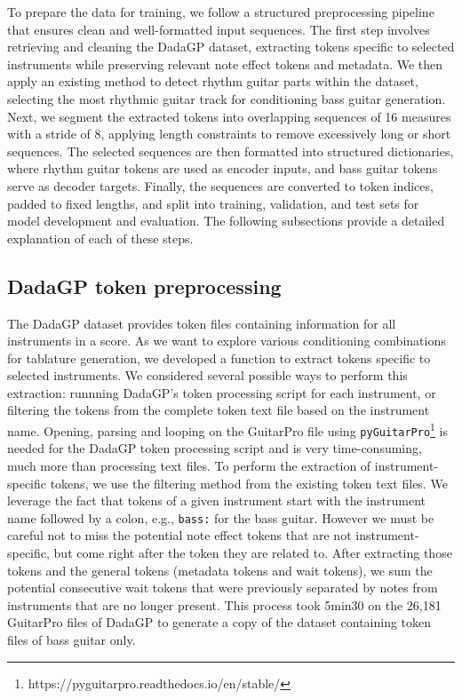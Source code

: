 
To prepare the data for training, we follow a structured preprocessing pipeline that ensures clean and well-formatted input sequences.
The first step involves retrieving and cleaning the DadaGP dataset, extracting tokens specific to selected instruments while preserving relevant note effect tokens and metadata.
We then apply an existing method to detect rhythm guitar parts within the dataset, selecting the most rhythmic guitar track for conditioning bass guitar generation.  
Next, we segment the extracted tokens into overlapping sequences of 16 measures with a stride of 8, applying length constraints to remove excessively long or short sequences.
The selected sequences are then formatted into structured dictionaries, where rhythm guitar tokens are used as encoder inputs, and bass guitar tokens serve as decoder targets.  
Finally, the sequences are converted to token indices, padded to fixed lengths, and split into training, validation, and test sets for model development and evaluation.
The following subsections provide a detailed explanation of each of these steps.  

\subsection{DadaGP token preprocessing}

The DadaGP dataset provides token files containing information for all instruments in a score.
As we want to explore various conditioning combinations for tablature generation, we developed a function to extract tokens specific to selected instruments.
We considered several possible ways to perform this extraction: runnning DadaGP's token processing script for each instrument, or filtering the tokens from the complete token text file based on the instrument name.
Opening, parsing and looping on the GuitarPro file using \texttt{pyGuitarPro}\footnote{https://pyguitarpro.readthedocs.io/en/stable/} is needed for the DadaGP token processing script and is very time-consuming, much more than processing text files.
To perform the extraction of instrument-specific tokens, we use the filtering method from the existing token text files.
We leverage the fact that tokens of a given instrument start with the instrument name followed by a colon, e.g., \texttt{bass:} for the bass guitar.
However we must be careful not to miss the potential note effect tokens that are not instrument-specific, but come right after the token they are related to.
After extracting those tokens and the general tokens (metadata tokens and wait tokens),
we sum the potential consecutive wait tokens that were previously separated by notes from instruments that are no longer present.
This process took 5min30 on the 26,181 GuitarPro files of DadaGP to generate a copy of the dataset containing token files of bass guitar only.

